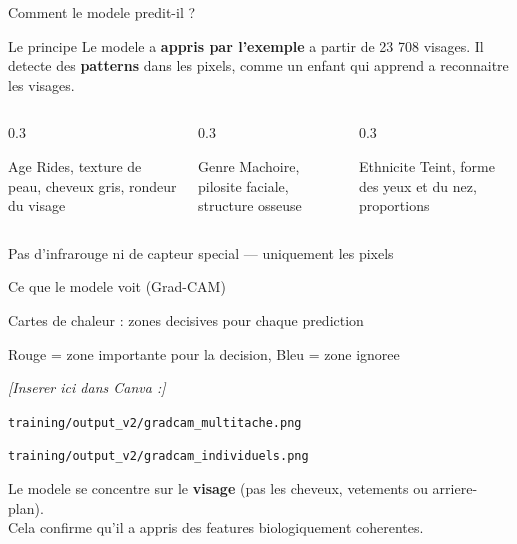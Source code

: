 \documentclass[aspectratio=169, 12pt]{beamer}
\begin{document}
\begin{frame}{Comment le modele predit-il ?}

\begin{exampleblock}{Le principe}
Le modele a \textbf{appris par l'exemple} a partir de 23 708 visages. Il detecte des \textbf{patterns} dans les pixels, comme un enfant qui apprend a reconnaitre les visages.
\end{exampleblock}

\vspace{0.2cm}

\begin{columns}[T]
\begin{column}{0.3\textwidth}
\begin{block}{\centering Age}
\centering
{\small Rides, texture de peau, cheveux gris, rondeur du visage}
\end{block}
\end{column}
\begin{column}{0.3\textwidth}
\begin{block}{\centering Genre}
\centering
{\small Machoire, pilosite faciale, structure osseuse}
\end{block}
\end{column}
\begin{column}{0.3\textwidth}
\begin{block}{\centering Ethnicite}
\centering
{\small Teint, forme des yeux et du nez, proportions}
\end{block}
\end{column}
\end{columns}

\vspace{0.2cm}
\centering
{\small\color{accent} Pas d'infrarouge ni de capteur special --- uniquement les pixels}
\end{frame}

\begin{frame}{Ce que le modele voit (Grad-CAM)}

\begin{center}
{\large\color{navy} Cartes de chaleur : zones decisives pour chaque prediction}

\vspace{0.3cm}
{\small Rouge = zone importante pour la decision, Bleu = zone ignoree}

\vspace{0.5cm}
{\color{steel}\textit{[Inserer ici dans Canva :]}}

{\small\texttt{training/output\_v2/gradcam\_multitache.png}}

{\small\texttt{training/output\_v2/gradcam\_individuels.png}}

\vspace{0.5cm}
{\small Le modele se concentre sur le \textbf{visage} (pas les cheveux, vetements ou arriere-plan).\\Cela confirme qu'il a appris des features biologiquement coherentes.}
\end{center}
\end{frame}
\end{document}
